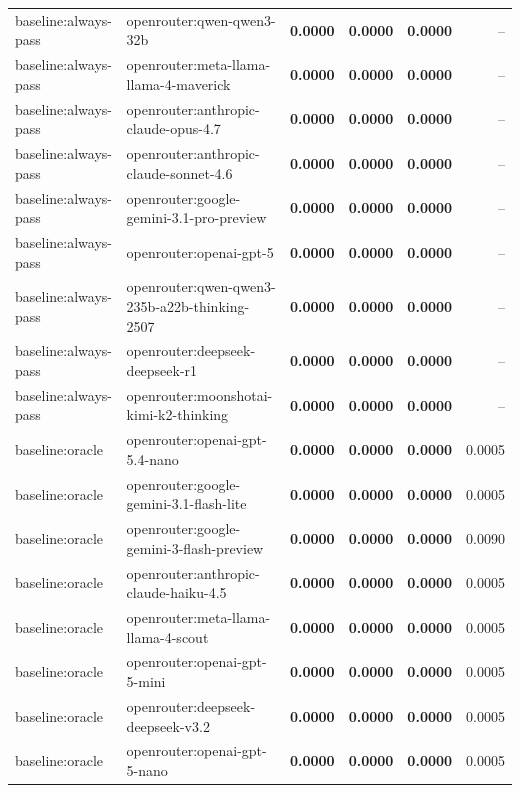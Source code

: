 \begin{table}[t]
\begin{tabular}{llrrrr}
baseline:always-pass & openrouter:qwen-qwen3-32b & \textbf{0.0000} & \textbf{0.0000} & \textbf{0.0000} & -- \\
baseline:always-pass & openrouter:meta-llama-llama-4-maverick & \textbf{0.0000} & \textbf{0.0000} & \textbf{0.0000} & -- \\
baseline:always-pass & openrouter:anthropic-claude-opus-4.7 & \textbf{0.0000} & \textbf{0.0000} & \textbf{0.0000} & -- \\
baseline:always-pass & openrouter:anthropic-claude-sonnet-4.6 & \textbf{0.0000} & \textbf{0.0000} & \textbf{0.0000} & -- \\
baseline:always-pass & openrouter:google-gemini-3.1-pro-preview & \textbf{0.0000} & \textbf{0.0000} & \textbf{0.0000} & -- \\
baseline:always-pass & openrouter:openai-gpt-5 & \textbf{0.0000} & \textbf{0.0000} & \textbf{0.0000} & -- \\
baseline:always-pass & openrouter:qwen-qwen3-235b-a22b-thinking-2507 & \textbf{0.0000} & \textbf{0.0000} & \textbf{0.0000} & -- \\
baseline:always-pass & openrouter:deepseek-deepseek-r1 & \textbf{0.0000} & \textbf{0.0000} & \textbf{0.0000} & -- \\
baseline:always-pass & openrouter:moonshotai-kimi-k2-thinking & \textbf{0.0000} & \textbf{0.0000} & \textbf{0.0000} & -- \\
baseline:oracle & openrouter:openai-gpt-5.4-nano & \textbf{0.0000} & \textbf{0.0000} & \textbf{0.0000} & 0.0005 \\
baseline:oracle & openrouter:google-gemini-3.1-flash-lite & \textbf{0.0000} & \textbf{0.0000} & \textbf{0.0000} & 0.0005 \\
baseline:oracle & openrouter:google-gemini-3-flash-preview & \textbf{0.0000} & \textbf{0.0000} & \textbf{0.0000} & 0.0090 \\
baseline:oracle & openrouter:anthropic-claude-haiku-4.5 & \textbf{0.0000} & \textbf{0.0000} & \textbf{0.0000} & 0.0005 \\
baseline:oracle & openrouter:meta-llama-llama-4-scout & \textbf{0.0000} & \textbf{0.0000} & \textbf{0.0000} & 0.0005 \\
baseline:oracle & openrouter:openai-gpt-5-mini & \textbf{0.0000} & \textbf{0.0000} & \textbf{0.0000} & 0.0005 \\
baseline:oracle & openrouter:deepseek-deepseek-v3.2 & \textbf{0.0000} & \textbf{0.0000} & \textbf{0.0000} & 0.0005 \\
baseline:oracle & openrouter:openai-gpt-5-nano & \textbf{0.0000} & \textbf{0.0000} & \textbf{0.0000} & 0.0005 \\

\end{tabular}
\end{table}
